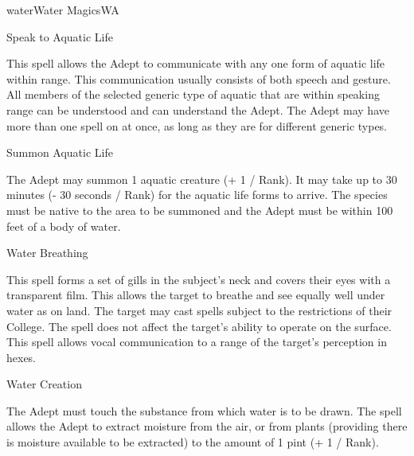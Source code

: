 \begin{college}[1.3]{water}{Water Magics}{WA}
\begin{spell}[G-9]{Speak to Aquatic Life}

\begin{effects}
This spell allows the Adept to communicate with any one form of
aquatic life within range. This communication usually consists of both
speech and gesture. All members of the selected generic type of
aquatic that are within speaking range can be understood and can
understand the Adept. The Adept may have more than one spell on at
once, as long as they are for different generic types.
\end{effects}
\end{spell}


\begin{spell}[G-10]{Summon Aquatic Life}

\begin{effects}
The Adept may summon 1 aquatic creature (+ 1 / Rank). It may take up
to 30 minutes (- 30 seconds / Rank) for the aquatic life forms to
arrive. The species must be native to the area to be summoned and the
Adept must be within 100 feet of a body of water.
\end{effects}
\end{spell}


\begin{spell}[G-11]{Water Breathing}

\begin{effects}
This spell forms a set of gills in the subject's neck and covers their
eyes with a transparent film. This allows the target to breathe and
see equally well under water as on land. The target may cast spells
subject to the restrictions of their College.  The spell does not
affect the target's ability to operate on the surface.  This spell
allows vocal communication to a range of the target's perception in
hexes.
\end{effects}
\end{spell}


\begin{spell}[G-12]{Water Creation}

\begin{effects}
The Adept must touch the substance from which water is to be
drawn. The spell allows the Adept to extract moisture from the air, or
from plants (providing there is moisture available to be extracted) to
the amount of 1 pint (+ 1 / Rank).
\end{effects}
\end{spell}



\end{college}

